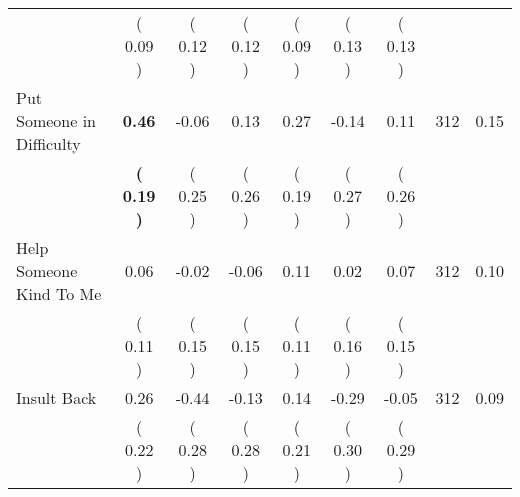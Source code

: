 \begin{tabular}{lcccccccc}
 & (     0.09 ) & (     0.12 ) & (     0.12 ) & (     0.09 ) & (     0.13 ) & (     0.13 ) & \\
Put Someone in Difficulty & \textbf{     0.46} &     -0.06 &      0.13 &      0.27 &     -0.14 &      0.11 & 312 &       0.15 \\ 
 & \textbf{(     0.19 )} & (     0.25 ) & (     0.26 ) & (     0.19 ) & (     0.27 ) & (     0.26 ) & \\
Help Someone Kind To Me &      0.06 &     -0.02 &     -0.06 &      0.11 &      0.02 &      0.07 & 312 &       0.10 \\ 
 & (     0.11 ) & (     0.15 ) & (     0.15 ) & (     0.11 ) & (     0.16 ) & (     0.15 ) & \\
Insult Back &      0.26 &     -0.44 &     -0.13 &      0.14 &     -0.29 &     -0.05 & 312 &       0.09 \\ 
 & (     0.22 ) & (     0.28 ) & (     0.28 ) & (     0.21 ) & (     0.30 ) & (     0.29 ) & \\
\bottomrule
\end{tabular}

